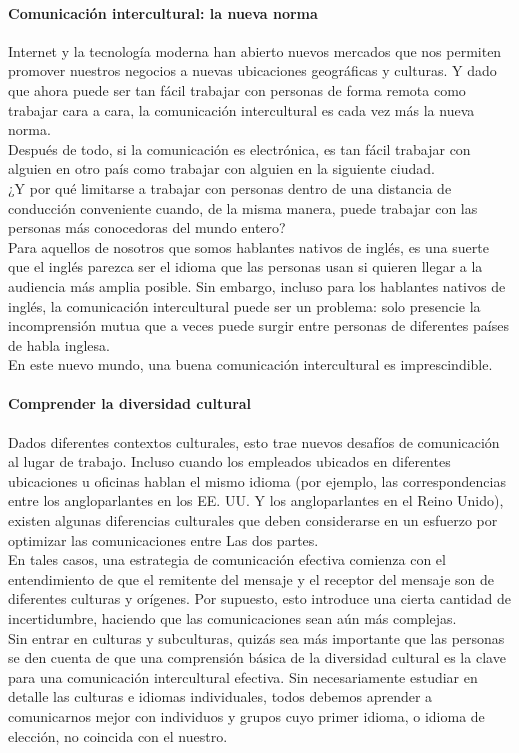 \documentclass[10pt]{book}
\begin{document}
\paragraph{Comunicación intercultural: la nueva norma}
Internet y la tecnología moderna han abierto nuevos mercados que nos permiten promover nuestros negocios a nuevas ubicaciones geográficas y culturas. Y dado que ahora puede ser tan fácil trabajar con personas de forma remota como trabajar cara a cara, la comunicación intercultural es cada vez más la nueva norma.\\
Después de todo, si la comunicación es electrónica, es tan fácil trabajar con alguien en otro país como trabajar con alguien en la siguiente ciudad.\\
¿Y por qué limitarse a trabajar con personas dentro de una distancia de conducción conveniente cuando, de la misma manera, puede trabajar con las personas más conocedoras del mundo entero?\\
Para aquellos de nosotros que somos hablantes nativos de inglés, es una suerte que el inglés parezca ser el idioma que las personas usan si quieren llegar a la audiencia más amplia posible. Sin embargo, incluso para los hablantes nativos de inglés, la comunicación intercultural puede ser un problema: solo presencie la incomprensión mutua que a veces puede surgir entre personas de diferentes países de habla inglesa.\\
En este nuevo mundo, una buena comunicación intercultural es imprescindible.
\paragraph{Comprender la diversidad cultural}
Dados diferentes contextos culturales, esto trae nuevos desafíos de comunicación al lugar de trabajo. Incluso cuando los empleados ubicados en diferentes ubicaciones u oficinas hablan el mismo idioma (por ejemplo, las correspondencias entre los angloparlantes en los EE. UU. Y los angloparlantes en el Reino Unido), existen algunas diferencias culturales que deben considerarse en un esfuerzo por optimizar las comunicaciones entre Las dos partes.\\
En tales casos, una estrategia de comunicación efectiva comienza con el entendimiento de que el remitente del mensaje y el receptor del mensaje son de diferentes culturas y orígenes. Por supuesto, esto introduce una cierta cantidad de incertidumbre, haciendo que las comunicaciones sean aún más complejas.\\
Sin entrar en culturas y subculturas, quizás sea más importante que las personas se den cuenta de que una comprensión básica de la diversidad cultural es la clave para una comunicación intercultural efectiva. Sin necesariamente estudiar en detalle las culturas e idiomas individuales, todos debemos aprender a comunicarnos mejor con individuos y grupos cuyo primer idioma, o idioma de elección, no coincida con el nuestro.
\end{document}
